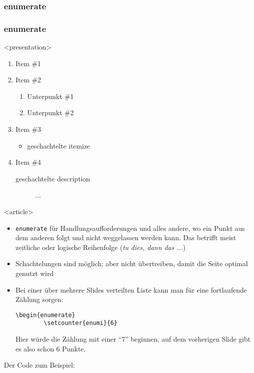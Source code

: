 \subsubsection{enumerate}
\begin{frame}[fragile]
\frametitle<presentation>{enumerate}


\mode
<presentation>
\begin{enumerate}
 \item Item \#1
 \item Item \#2
\begin{enumerate}
 \item Unterpunkt \#1
 \item Unterpunkt \#2
\end{enumerate}
 \item Item \#3
 \begin{itemize}
  \item geschachtelte itemize
 \end{itemize}
 \item Item \#4
 \begin{description}
  \item[geschachtelte description] ...
 \end{description}
\end{enumerate}

\mode
<article>
\begin{itemize}
 \item \verb+enumerate+ für Handlungsaufforderungen und alles andere, wo ein Punkt aus dem anderen folgt und nicht weggelassen werden kann. Das betrifft meist zeitliche oder logische Reihenfolge (\textit{tu dies, dann das ...})
\item Schachtelungen sind möglich; aber nicht übertreiben, damit die Seite optimal genutzt wird
\item Bei einer über mehrere Slides verteilten Liste kann man für eine fortlaufende Zählung sorgen:
\begin{lstlisting}
\begin{enumerate}
        \setcounter{enumi}{6}
\end{lstlisting}
Hier würde die Zählung mit einer "`7"' beginnen, auf dem vorherigen Slide gibt es also schon 6 Punkte.
\end{itemize}

Der Code zum Beispiel:


\end{frame}
